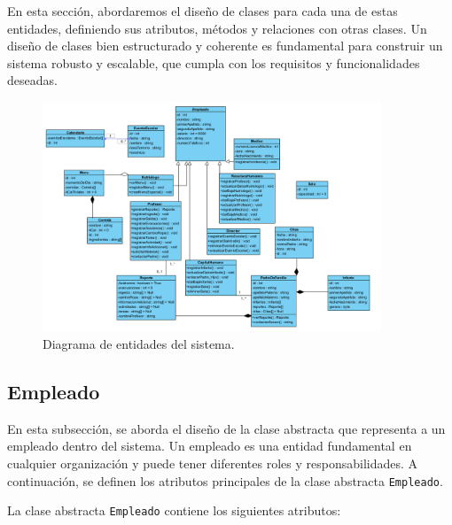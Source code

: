 En esta sección, abordaremos el diseño de clases para cada una de estas entidades, definiendo sus atributos, métodos y relaciones con otras clases. Un diseño de clases bien estructurado y coherente es fundamental para construir un sistema robusto y escalable, que cumpla con los requisitos y funcionalidades deseadas.


\begin{figure}[htbp]
\centering
\includegraphics[width=0.9\textwidth]{images/arqui/entidades.png}
\caption{Diagrama de entidades del sistema.}
\label{fig:entidades}
\end{figure}
\clearpage

\subsection{Empleado}

En esta subsección, se aborda el diseño de la clase abstracta que representa a un empleado dentro del sistema. Un empleado es una entidad fundamental en cualquier organización y puede tener diferentes roles y responsabilidades. A continuación, se definen los atributos principales de la clase abstracta \texttt{Empleado}.

La clase abstracta \texttt{Empleado} contiene los siguientes atributos:

